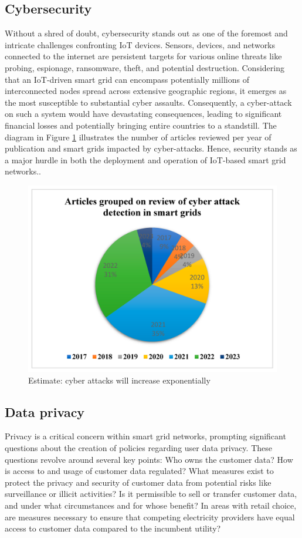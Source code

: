 \subsection{Cybersecurity}
Without a shred of doubt, cybersecurity stands out as one of the foremost and intricate challenges confronting IoT devices. Sensors, devices, and networks connected to the internet are persistent targets for various online threats like probing, espionage, ransomware, theft, and potential destruction. Considering that an IoT-driven smart grid can encompass potentially millions of interconnected nodes spread across extensive geographic regions, it emerges as the most susceptible to substantial cyber assaults. Consequently, a cyber-attack on such a system would have devastating consequences, leading to significant financial losses and potentially bringing entire countries to a standstill. The diagram in Figure \ref{fig:attacks} illustrates the number of articles reviewed per year of publication and smart grids impacted by cyber-attacks. Hence, security stands as a major hurdle in both the deployment and operation of IoT-based smart grid networks.\cite{kimani2019cyber}.
\begin{figure}[h]
	\centering
	\includegraphics[width=12cm]{figures/attack.png}
	\caption{Estimate: cyber attacks will increase exponentially \cite{mdpi-link}}
	\label{fig:attacks}
\end{figure}
\newpage
\subsection{Data privacy}
Privacy is a critical concern within smart grid networks, prompting significant questions about the creation of policies regarding user data privacy. These questions revolve around several key points: Who owns the customer data? How is access to and usage of customer data regulated? What measures exist to protect the privacy and security of customer data from potential risks like surveillance or illicit activities? Is it permissible to sell or transfer customer data, and under what circumstances and for whose benefit? In areas with retail choice, are measures necessary to ensure that competing electricity providers have equal access to customer data compared to the incumbent utility?

